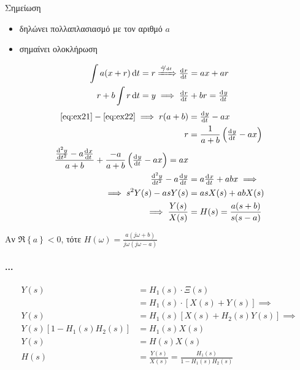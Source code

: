 \documentclass[11pt,a4paper,titlepage,fleqn]{article}
\begin{document}
   \begin{infobox}{Σημείωση}
   	\begin{itemize}
   	\item {}\hspace{.7em} δηλώνει πολλαπλασιασμό με τον αριθμό \( a \)
   	\item {}\hspace{.7em} σημαίνει ολοκλήρωση
   	\end{itemize}
   \end{infobox}
   
   
   \begin{align}
   	\int a(x+r) \dif t &= r \xRightarrow{\sfrac{\dif}{\dif t} } \od{r}{t} = ax+ar
   	 \label{eq:ex21}
   	\\ r+b\int r\dif t &= y \implies \od{r}{t} + br = \od{y}{t} \label{eq:ex22}
   	\end{align}
   	\begin{align*}
   	\eqref{eq:ex21} - \eqref{eq:ex22} \implies r(a+b) &= \od{y}{t} - ax \\
   	r &= \frac{1}{a+b} \left(\od{y}{t} - ax\right) \\
   	\frac{\od[2]{y}{t}-a\od{x}{t}}{a+b} + \frac{-a}{a+b} \left(
   	\od{y}{t}-ax
   	\right) = ax \\
   	\od[2]{y}{t} - a\od{y}{t} &= a\od{x}{t} + abx
   	\implies \\ \implies s^2Y(s) - asY(s) &= asX(s) + abX(s) \\
   	\implies \frac{Y(s)}{X(s)} &= H(s) = \frac{a(s+b)}{s(s-a)}
   \end{align*}
   
   Αν \( \Re\left\lbrace a \right\rbrace < 0 \), τότε 
   \( \displaystyle H(\omega ) = \frac{a(j\omega +b)}{j\omega (j\omega -a)} \)

    \paragraph{...}
    
    \begin{align*}
    	Y(s) &= H_1(s) \cdot \Xi(s) \\
    	&= H_1(s) \cdot \left[ X(s) + Y(s) \right] \implies \\
    	Y(s) &= H_1(s) \left[ X(s)+H_2(s)Y(s) \right] \implies \\
    	Y(s) \left[1-H_1(s)H_2(s)\right] &= H_1(s)X(s) \\[.3em]
    	Y(s) &= H(s) X(s) \\
    	H(s) &= \frac{Y(s)}{X(s)} = \frac{H_1(s)}{1-H_1(s)H_2(s)}
    \end{align*}
    
\end{document}
